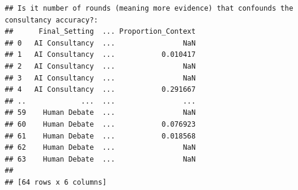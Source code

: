 \documentclass[
]{article}
\newenvironment{Shaded}{\begin{snugshade}}{\end{snugshade}}
\newcommand{\AttributeTok}[1]{\textcolor[rgb]{0.13,0.29,0.53}{#1}}
\newcommand{\ConstantTok}[1]{\textcolor[rgb]{0.56,0.35,0.01}{#1}}
\newcommand{\ControlFlowTok}[1]{\textcolor[rgb]{0.13,0.29,0.53}{\textbf{#1}}}
\newcommand{\FunctionTok}[1]{\textcolor[rgb]{0.13,0.29,0.53}{\textbf{#1}}}
\newcommand{\NormalTok}[1]{#1}
\newcommand{\OtherTok}[1]{\textcolor[rgb]{0.56,0.35,0.01}{#1}}
\newcommand{\SpecialCharTok}[1]{\textcolor[rgb]{0.81,0.36,0.00}{\textbf{#1}}}
\newcommand{\StringTok}[1]{\textcolor[rgb]{0.31,0.60,0.02}{#1}}
\begin{document}
\begin{verbatim}
## Is it number of rounds (meaning more evidence) that confounds the consultancy accuracy?:
##      Final_Setting  ... Proportion_Context
## 0   AI Consultancy  ...                NaN
## 1   AI Consultancy  ...           0.010417
## 2   AI Consultancy  ...                NaN
## 3   AI Consultancy  ...                NaN
## 4   AI Consultancy  ...           0.291667
## ..             ...  ...                ...
## 59    Human Debate  ...                NaN
## 60    Human Debate  ...           0.076923
## 61    Human Debate  ...           0.018568
## 62    Human Debate  ...                NaN
## 63    Human Debate  ...                NaN
## 
## [64 rows x 6 columns]
\end{verbatim}

\begin{Shaded}
\end{Shaded}
\end{document}
